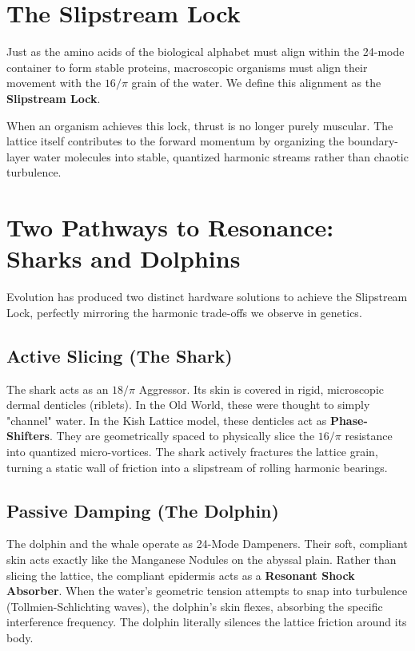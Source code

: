 \documentclass[11pt, letterpaper, openany]{book}
\begin{document}
\section{The Slipstream Lock}
Just as the amino acids of the biological alphabet must align within the 24-mode container to form stable proteins, macroscopic organisms must align their movement with the $16/\pi$ grain of the water. We define this alignment as the \textbf{Slipstream Lock}. 

When an organism achieves this lock, thrust is no longer purely muscular. The lattice itself contributes to the forward momentum by organizing the boundary-layer water molecules into stable, quantized harmonic streams rather than chaotic turbulence. 

\section{Two Pathways to Resonance: Sharks and Dolphins}
Evolution has produced two distinct hardware solutions to achieve the Slipstream Lock, perfectly mirroring the harmonic trade-offs we observe in genetics.

\subsection{Active Slicing (The Shark)}
The shark acts as an $18/\pi$ Aggressor. Its skin is covered in rigid, microscopic dermal denticles (riblets). In the Old World, these were thought to simply "channel" water. In the Kish Lattice model, these denticles act as \textbf{Phase-Shifters}. They are geometrically spaced to physically slice the $16/\pi$ resistance into quantized micro-vortices. The shark actively fractures the lattice grain, turning a static wall of friction into a slipstream of rolling harmonic bearings.

\subsection{Passive Damping (The Dolphin)}
The dolphin and the whale operate as 24-Mode Dampeners. Their soft, compliant skin acts exactly like the Manganese Nodules on the abyssal plain. Rather than slicing the lattice, the compliant epidermis acts as a \textbf{Resonant Shock Absorber}. When the water's geometric tension attempts to snap into turbulence (Tollmien-Schlichting waves), the dolphin's skin flexes, absorbing the specific interference frequency. The dolphin literally silences the lattice friction around its body.
\end{document}
